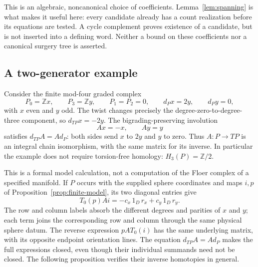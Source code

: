 \documentclass[11pt]{amsart}
\theoremstyle{definition}
\theoremstyle{remark}
\theoremstyle{plain}
\newcommand{\ZZ}{\mathbb Z}
\begin{document}
This is an algebraic, noncanonical choice of coefficients.
Lemma~\ref{lem:spanning} is what makes it useful here: every
candidate already has a count realization before its equations
are tested. A cycle complement proves existence of a candidate,
but is not inserted into a defining word. Neither a bound on
these coefficients nor a canonical surgery tree is asserted.

\subsection{A two-generator example}
Consider the finite mod-four graded complex
\[
 P_0=\ZZ x,\qquad P_3=\ZZ y,\qquad
 P_1=P_2=0,\qquad d_Px=2y,\qquad d_Py=0,
\]
with $x$ even and $y$ odd. The twist changes precisely the
degree-zero-to-degree-three component, so $d_{TP}x=-2y$.
The bigrading-preserving involution
\[
 Ax=-x,\qquad Ay=y
\]
satisfies $d_{TP}A=Ad_P$: both sides send $x$ to $2y$ and
$y$ to zero. Thus $A:P\to TP$ is an integral chain isomorphism,
with the same matrix for its inverse. In particular the example
does not require torsion-free homology: $H_3(P)=\ZZ/2$.

This is a formal model calculation, not a computation of the
Floer complex of a specified manifold. If $P$ occurs with the
supplied sphere coordinates and maps $i,p$ of
Proposition~\ref{prop:finite-model}, its two diagonal entries give
\begin{equation}\label{eq:two-generator-example}
 T_0(p)Ai=-c_x\,1_D\,r_x+c_y\,1_D\,r_y.
\end{equation}
The row and column labels absorb the different degrees and
parities of $x$ and $y$; each term joins the corresponding row
and column through the same physical sphere datum. The reverse
expression $pA T_0(i)$ has the same underlying matrix, with its
opposite endpoint orientation lines. The equation $d_{TP}A=Ad_P$
makes the full expressions closed, even though their individual
summands need not be closed. The following proposition verifies
their inverse homotopies in general.
\end{document}
